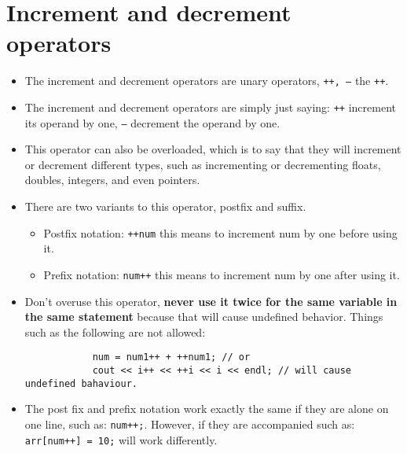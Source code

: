 \section{Increment and decrement operators}
\begin{itemize}
    \item The increment and decrement operators are unary operators, \texttt{++, --} the \texttt{++}.
    \item The increment and decrement operators are simply just saying: \texttt{++} increment its operand by one, \texttt{--} decrement the operand by one.
    \item This operator can also be overloaded, which is to say that they will increment or decrement different types, such as incrementing or decrementing floats, doubles, integers, and even pointers.
    \item There are two variants to this operator, postfix and suffix. 
        \begin{itemize}
            \item Postfix notation: \texttt{++num} this means to increment num by one before using it. 
            \item Prefix notation: \texttt{num++} this means to increment num by one after using it.
        \end{itemize}
    
    \item Don't overuse this operator, \textbf{never use it twice for the same variable in the same statement} because that will cause undefined behavior. Things such as the following are not allowed: 
        \begin{verbatim}
            num = num1++ + ++num1; // or
            cout << i++ << ++i << i << endl; // will cause undefined bahaviour.
        \end{verbatim}
    
    \item The post fix and prefix notation work exactly the same if they are alone on one line, such as: \texttt{num++;}. However, if they are accompanied such as: \texttt{arr[num++] = 10;} will work differently.
\end{itemize}

